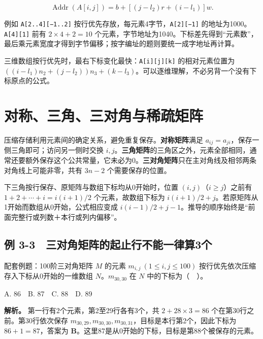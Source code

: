 \[\operatorname{Addr}(A[i,j])=b+[(j-l_2)r+(i-l_1)]w.\]

例如 \texttt{A[\allowbreak{}2.\allowbreak{}.\allowbreak{}4]\allowbreak{}[\allowbreak{}−1.\allowbreak{}.\allowbreak{}2]\allowbreak{}} 按行优先存放，每元素4字节，\texttt{A[\allowbreak{}2]\allowbreak{}[\allowbreak{}−1]\allowbreak{}} 的地址为1000。\texttt{A[\allowbreak{}4]\allowbreak{}[\allowbreak{}1]\allowbreak{}} 前有 \(2\times4+2=10\) 个元素，字节地址为1040。下标差先得到``元素数''，最后乘元素宽度才得到字节偏移；按字编址的题则要统一成字地址再计算。

三维数组按行优先时，最右下标变化最快：\texttt{A[\allowbreak{}i]\allowbreak{}[\allowbreak{}j]\allowbreak{}[\allowbreak{}k]\allowbreak{}} 的相对元素位置为 \(((i-l_1)n_2+(j-l_2))n_3+(k-l_3)\)。可以逐维理解，不必另背一个没有下标原点的公式。

\section{对称、三角、三对角与稀疏矩阵}\label{DS03-06}

压缩存储利用元素间的确定关系，避免重复保存。\textbf{对称矩阵}满足 \(a_{ij}=a_{ji}\)，保存一侧三角即可；访问另一侧时交换 \(i,j\)。\textbf{三角矩阵}的三角区之外，元素全部相同，通常还要额外保存这个公共常量，它未必为0。\textbf{三对角矩阵}只在主对角线及相邻两条对角线上可能非零，共有 \(3n-2\) 个需要保存的位置。

下三角按行保存、原矩阵与数组下标均从0开始时，位置 \((i,j)\)（\(i\ge j\)）之前有 \(1+2+\cdots+i=i(i+1)/2\) 个元素，故数组下标为 \(i(i+1)/2+j\)。若原矩阵从1开始而数组从0开始，公式相应变成 \(i(i-1)/2+j-1\)。推导的顺序始终是``前面完整行或列数＋本行或列内偏移''。

\subsection{例 3-3　三对角矩阵的起止行不能一律算3个}\label{DS03-ex3}

\begin{example}[配套例题]

配套例题：100阶三对角矩阵 \(M\) 的元素 \(m_{i,j}\ (1\le i,j\le100)\) 按行优先依次压缩存入下标从0开始的一维数组 \(N\)。\(m_{30,30}\) 在 \(N\) 中的下标为（　）。

A. 86　B. 87　C. 88　D. 89

\end{example}

\textbf{解析。} 第一行有2个元素，第2至29行各有3个，共 \(2+28\times3=86\) 个在第30行之前。第30行依次保存 \(m_{30,29},m_{30,30},m_{30,31}\)，目标是本行第2个，因此下标为 \(86+1=87\)，答案为 \textbf{B}。这里87是从0开始的下标，目标是第88个被保存的元素。

